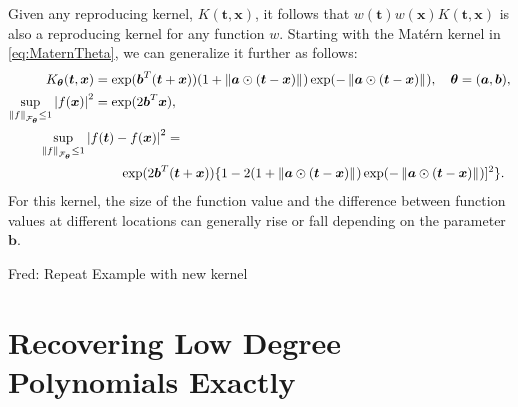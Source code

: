\documentclass[]{mcom-l}
\theoremstyle{remark}
\newcommand{\ba}{{\boldsymbol{a}}}
\newcommand{\bb}{{\boldsymbol{b}}}
\newcommand{\bx}{{\boldsymbol{x}}}
\newcommand{\bt}{{\boldsymbol{t}}}
\newcommand{\btheta}{{\boldsymbol{\theta}}}
\newcommand{\calf}{{\mathcal{F}}}
\def\abs#1{\ensuremath{\left \lvert #1 \right \rvert}}
\newcommand{\norm}[2][{}]{\ensuremath{\left \lVert #2 \right \rVert}_{#1}}
\newcommand{\FredNote}[1]{{\color{blue}Fred: #1}}
\begin{document}
Given any reproducing kernel, $K(\bt ,\bx)$, it follows that $w(\bt)w(\bx)K(\bt ,\bx)$ is also a reproducing kernel for any function $w$.  Starting with the Mat\'ern kernel in \eqref{eq:MaternTheta}, we can generalize it further as follows:
\begin{align} \label{eq:MaternAB}
K_\btheta(\bt,\bx) &= \exp(\bb^T(\bt + \bx))(1 +  \norm{\ba \odot (\bt-\bx)}) \exp(-\norm{\ba \odot (\bt-\bx)}),  \quad \btheta=(\ba, \bb), \\
\nonumber
\sup_{\norm[\calf_{\btheta}]{f} \le 1} \abs{f(\bx)}^2 &= \exp(2\bb^T\bx), \\
\nonumber
\MoveEqLeft[4]{\sup_{\norm[\calf_{\btheta}]{f} \le 1} \abs{f(\bt) - f(\bx)}^2} = \\
\nonumber 
& \qquad \exp(2\bb^T(\bt + \bx))\{ 1 - 2 (1 +  \norm{\ba \odot (\bt-\bx)}) \exp(-\norm{\ba \odot (\bt-\bx)})]^2\}.
\end{align}
For this kernel, the size of the function value and the difference between function values at different locations can generally rise or fall depending on the parameter $\bb$.

\FredNote{Repeat Example with new kernel}

\section{Recovering Low Degree Polynomials Exactly} \label{sec:poly}
\end{document}
